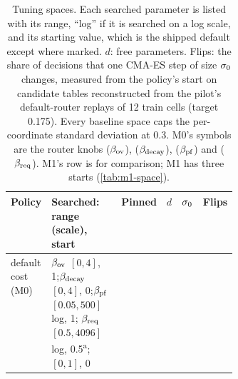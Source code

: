 \begin{table}[tbp]
  \centering\footnotesize
  \caption{Tuning spaces. Each searched parameter is listed with its range, ``log'' if it is
    searched on a log scale, and its starting value, which is the shipped default except where
    marked. $d$: free parameters. Flips: the share of decisions that one CMA-ES step of size
    $\sigmazero$ changes, measured from the policy's start on candidate tables reconstructed
    from the pilot's default-router replays of 12 train cells (target 0.175). Every baseline space
    caps the per-coordinate standard deviation at 0.3. M0's symbols are the router knobs
     ($\bov$),  ($\bdecay$),
     ($\bpf$) and  ($\breq$).
    M1's row is for comparison; M1 has three starts (\cref{tab:m1-space}).}
  \label{tab:baseline-spaces}
  \begin{tabularx}{\linewidth}{@{}P{0.17\linewidth}YP{0.2\linewidth}ccc@{}}
    \toprule
    Policy & Searched: range (scale), start & Pinned & $d$ & $\sigmazero$ & Flips \\
    \midrule
    default cost (M0)
      & $\bov$ $[0, 4]$, 1;\newline $\bdecay$ $[0, 4]$, 0;\newline $\bpf$ $[0.05, 500]$ log, 1;\newline
        $\breq$ $[0.5, 4096]$ log, 0.5\textsuperscript{a};\newline {} $[0, 1]$, 0

\end{tabularx}
\end{table}
